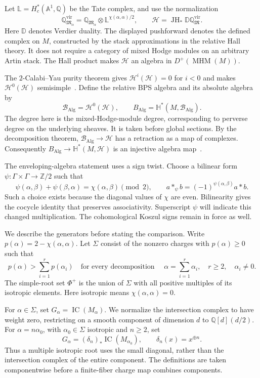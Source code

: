 Let $\mathbb L=H_c^*(\mathbb A^1,\mathbb Q)$ be the Tate complex, and use the normalization
\[
 \mathbb Q^{\mathrm{vir}}_{\mathfrak M_\alpha}
   =\mathbb Q_{\mathfrak M_\alpha}\otimes\mathbb L^{\chi(\alpha,\alpha)/2},
 \qquad
 \mathscr H=\operatorname{JH}_*\mathbb D\mathbb Q^{\mathrm{vir}}_{\mathfrak M}.
\]
Here $\mathbb D$ denotes Verdier duality.
The displayed pushforward denotes the defined complex on $M$, constructed by the stack approximations in the relative Hall theory.
It does not require a category of mixed Hodge modules on an arbitrary Artin stack.
The Hall product makes $\mathscr H$ an algebra in $D^+(\operatorname{MHM}(M))$.

The $2$-Calabi--Yau purity theorem gives $\mathcal H^i(\mathscr H)=0$ for $i<0$ and makes $\mathcal H^0(\mathscr H)$ semisimple~\cite[Lemma~6.3]{DHS}.
Define the relative BPS algebra and its absolute algebra by
\[
 \mathscr B_{\mathrm{Alg}}=\mathcal H^0(\mathscr H),
 \qquad
 B_{\mathrm{Alg}}=\mathbb H^*(M,\mathscr B_{\mathrm{Alg}}).
\]
The degree here is the mixed-Hodge-module degree, corresponding to perverse degree on the underlying sheaves.
It is taken before global sections.
By the decomposition theorem, $\mathscr B_{\mathrm{Alg}}\to\mathscr H$ has a retraction as a map of complexes.
Consequently $B_{\mathrm{Alg}}\to\mathbb H^*(M,\mathscr H)$ is an injective algebra map~\cite[Proposition~6.4]{DHS}.

The enveloping-algebra statement uses a sign twist.
Choose a bilinear form $\psi:\Gamma\times\Gamma\to\mathbb Z/2$ such that
\[
 \psi(\alpha,\beta)+\psi(\beta,\alpha)
       =\chi(\alpha,\beta)\pmod2,
 \qquad
 a*_{\psi}b=(-1)^{\psi(\alpha,\beta)}a*b.
\]
Such a choice exists because the diagonal values of $\chi$ are even.
Bilinearity gives the cocycle identity that preserves associativity.
Superscript $\psi$ will indicate this changed multiplication.
The cohomological Koszul signs remain in force as well.

We describe the generators before stating the comparison.
Write $p(\alpha)=2-\chi(\alpha,\alpha)$.
Let $\Sigma$ consist of the nonzero charges with $p(\alpha)\geq0$ such that
\[
 p(\alpha)>\sum_{i=1}^r p(\alpha_i)
 \quad\text{for every decomposition }\quad
 \alpha=\sum_{i=1}^r\alpha_i,
 \quad r\geq2,\quad\alpha_i\ne0.
\]
The simple-root set $\Phi^+$ is the union of $\Sigma$ with all positive multiples of its isotropic elements.
Here isotropic means $\chi(\alpha,\alpha)=0$.

For $\alpha\in\Sigma$, set $G_\alpha=\operatorname{IC}(M_\alpha)$.
We normalize the intersection complex to have weight zero, restricting on a smooth component of dimension $d$ to $\mathbb Q[d](d/2)$.
For $\alpha=n\alpha_0$, with $\alpha_0\in\Sigma$ isotropic and $n\geq2$, set
\[
 G_\alpha=(\delta_n)_*\operatorname{IC}(M_{\alpha_0}),
 \qquad
 \delta_n(x)=x^{\oplus n}.
\]
Thus a multiple isotropic root uses the small diagonal, rather than the intersection complex of the entire component.
The definitions are taken componentwise before a finite-fiber charge map combines components.

